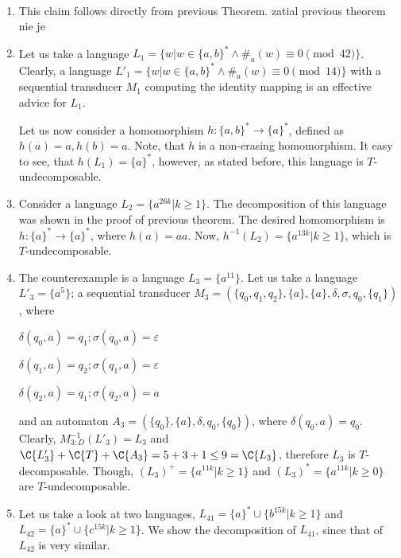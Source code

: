 \paragraph{}
\dokaz
\begin{enumerate}
\item This claim follows directly from previous Theorem. \color{red}zatial previous theorem nie je\color{black}

\item Let us take a language $L_1 = \{w|w \in \{ a,b\}^* \wedge \#_{a}(w) \equiv 0 \pmod{42} \}$. Clearly, a language $L'_1 = \{w|w \in \{ a,b\}^* \wedge \#_{a}(w) \equiv 0 \pmod{14} \}$ with a sequential transducer $M_1$ computing the identity mapping is an effective advice for $L_1$.

Let us now consider a homomorphism $h: \{ a,b\}^* \to \{ a \}^*$, defined as $h(a) = a, h(b) = a$. Note, that $h$ is a non-erasing homomorphism. It easy to see, that $h(L_1) = \{ a \}^*$, however, as stated before, this language is $T$-undecomposable.

\item Consider a language $L_2 = \{ a^{26k} | k \geq 1 \}$. The decomposition of this language was shown in the proof of previous theorem. The desired homomorphism is $h: \{a\}^* \to \{a\}^*$, where $h(a) = aa$. Now, $h^{-1}(L_2) = \{ a^{13k} | k \geq 1 \}$, which is $T$-undecomposable.

\item The counterexample is a language $L_3 = \{ a^{11} \}$. Let us take a language $L'_3 = \{ a^{5} \}$; a sequential transducer $M_3 = (\{q_0, q_1, q_2\}, \{a\}, \{a\}, \delta, \sigma, q_0, \{q_1\})$, where\\
\centerline{$\delta(q_0,a) = q_1; \sigma(q_0,a) = \varepsilon$}
\centerline{$\delta(q_1,a) = q_2; \sigma(q_1,a) = \varepsilon$}
\centerline{$\delta(q_2,a) = q_1; \sigma(q_2,a) = a$}
and an automaton $A_3 = (\{q_0\}, \{a\}, \delta, q_0, \{q_0\}) $, where $\delta(q_0, a) = q_0$. Clearly, $M_{3;D}^{-1}(L'_3) = L_3$ and $\C{L'_3} + \C{T} + \C{A_3} = 5 + 3 + 1 \leq 9 = \C{L_3}$, therefore $L_3$ is $T$-decomposable. Though, $(L_3)^+ = \{ a^{11k} | k \geq 1 \}$ and $(L_3)^* = \{ a^{11k} | k \geq 0 \}$ are $T$-undecomposable.

\item Let us take a look at two languages, $L_{41} = \{ a \}^* \cup \{ b^{15k} | k \geq 1 \}$ and $L_{42} = \{ a\}^* \cup \{ c^{15k} | k \geq 1 \}$. We show the decomposition of $L_{41}$, since that of $L_{42}$ is very similar.


\end{enumerate}
